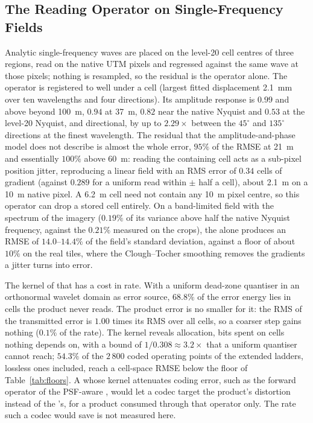 \subsection{The Reading Operator on Single-Frequency Fields}
\label{app:operator}
Analytic single-frequency waves are placed on the level-20 cell centres
of three regions, read on the native UTM pixels and regressed against the
same wave at those pixels; nothing is resampled, so the residual is the
operator alone. The operator is registered to well under a cell (largest
fitted displacement \SI{2.1}{\milli\metre} over ten wavelengths and four
directions). Its amplitude response is $0.99$ and above beyond
\SI{100}{m}, $0.94$ at \SI{37}{m}, $0.82$ near the native Nyquist and
$0.53$ at the level-20 Nyquist, and directional, by up to $2.29\times$
between the $45^\circ$ and $135^\circ$ directions at the finest
wavelength. The residual that the amplitude-and-phase model does not
describe is almost the whole error, $95\%$ of the RMSE at \SI{21}{m} and
essentially $100\%$ above \SI{60}{m}: reading the containing cell acts as
a sub-pixel position jitter, reproducing a linear field with an RMS error
of $0.34$ cells of gradient (against $0.289$ for a uniform read within
$\pm$ half a cell), about \SI{2.1}{m} on a \SI{10}{m} native pixel. A
\SI{6.2}{m} cell need not contain any \SI{10}{m} pixel centre, so this
operator can drop a stored cell entirely. On a band-limited field with
the spectrum of the imagery ($0.19\%$ of its variance above half the
native Nyquist frequency, against the $0.21\%$ measured on the crops),
the  alone produces an RMSE of $14.0$--$14.4\%$ of the field's
standard deviation, against a floor of about $10\%$ on the real tiles,
where the Clough--Tocher smoothing removes the gradients a jitter turns
into error.

The kernel of that  has a cost in rate. With a uniform
dead-zone quantiser in an orthonormal wavelet domain as error source,
$68.8\%$ of the error energy lies in cells the product never reads. The
product error is no smaller for it: the RMS of the transmitted error is
$1.00$ times its RMS over all cells, so a coarser step gains nothing
($0.1\%$ of the rate). The kernel reveals allocation, bits spent on cells
nothing depends on, with a bound of $1/0.308\approx3.2\times$ that a
uniform quantiser cannot reach; $54.3\%$ of the $2\,800$ coded operating
points of the extended ladders, lossless ones included, reach a cell-space RMSE below the floor of
Table~\ref{tab:floors}. A  whose kernel attenuates coding
error, such as the forward operator of the PSF-aware ,
would let a codec target the product's distortion instead of the
's, for a product consumed through that operator only. The rate such
a codec would save is not measured here.

